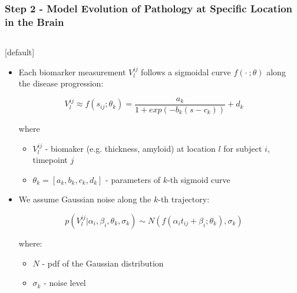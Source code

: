 \documentclass[8pt,xcolor=table]{beamer}
\begin{document}
\begin{frame}
\frametitle{Step 2 - Model Evolution of Pathology at Specific Location in the Brain}
\begin{columns}[T]
    \begin{column}{.7\textwidth}
    

    [default]
     \begin{itemize}
  
      \item Each biomarker measurement $V_l^{ij}$ follows a sigmoidal curve $f(\cdot\ ;\theta)$ along the disease progression:
      
      $$ V_l^{ij} \approx f(s_{ij};\theta_k) = \frac{a_k}{1+exp(-b_k(s-c_k))} + d_k $$
      
      where
      \begin{itemize}
      \item  $V_l^{ij}$ - biomaker (e.g. thickness, amyloid) at location $l$ for subject $i$, timepoint $j$
       \item $\theta_k = [a_k, b_k, c_k, d_k]$ - parameters of $k$-th sigmoid curve
      \end{itemize}
      
      \vspace{2em}
      
      \item We assume Gaussian noise along the $k$-th trajectory:

      $$p(V_l^{ij} | \alpha_i, \beta_i, \theta_k, \sigma_k) \sim N(f(\alpha_i t_{ij} + \beta_i ; \theta_k), \sigma_k)$$
            
      where:
      \begin{itemize}
       \item $N$ - pdf of the Gaussian distribution
       \item $\sigma_k$ - noise level
       
      \end{itemize}
            
     \end{itemize}
     

    \end{column}
    \hspace{-2em}
    \begin{column}{.25\textwidth}
    

\end{column}
\end{columns}
\end{frame}
\end{document}
